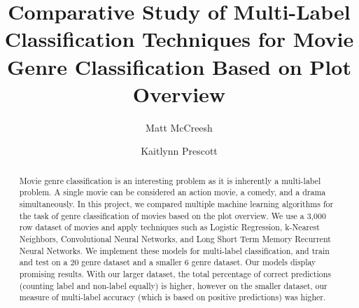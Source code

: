 \documentclass[sigconf]{acmart}
\begin{document}
%
\title{Comparative Study of Multi-Label Classification Techniques for Movie Genre Classification Based on Plot Overview}

%
\author{Matt McCreesh}

\author{Kaitlynn Prescott}

\renewcommand{\shortauthors}{Trovato and Tobin, et al.}
\linebreak\linebreak
%

\begin{abstract}
\noindent Movie genre classification is an interesting problem as it is inherently a multi-label problem.  A single movie can be considered an action movie, a comedy, and a drama simultaneously. In this project, we compared multiple machine learning algorithms for the task of genre classification of movies based on the plot overview. We use a 3,000 row dataset of movies and apply techniques such as Logistic Regression, k-Nearest Neighbors, Convolutional Neural Networks, and Long Short Term Memory Recurrent Neural Networks. We implement these models for multi-label classification, and train and test on a 20 genre dataset and a smaller 6 genre dataset. Our models display promising results. With our larger dataset, the total percentage of correct predictions (counting label and non-label equally) is higher, however on the smaller dataset, our measure of multi-label accuracy (which is based on positive predictions) was higher.
\end{abstract}

\end{document}
